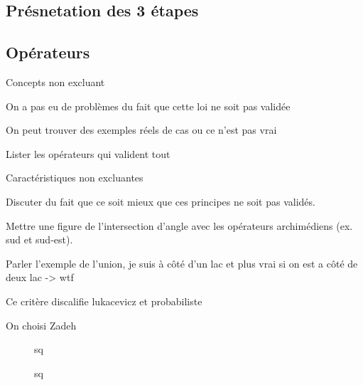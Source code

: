 \subsection{Présnetation des 3 étapes}



\subsection{Opérateurs}





Concepts non excluant

On a pas eu de problèmes du fait que cette loi ne soit pas validée

On peut trouver des exemples réels de cas ou ce n'est pas vrai

Lister les opérateurs qui valident tout

Caractéristiques non excluantes

Discuter du fait que ce soit mieux que ces principes ne soit pas
validés.


Mettre une figure de l'intersection d'angle avec les opérateurs
archimédiens (ex. sud et sud-est).

Parler l'exemple de l'union, je suis à côté d'un lac et plus vrai si
on est a côté de deux lac -> wtf

Ce critère discalifie lukacevicz et probabiliste


On choisi Zadeh

\begin{figure}
  \centering
  
  \caption{sq}
\end{figure}

\begin{figure}
  \centering
  
  \caption{sq}
\end{figure}



